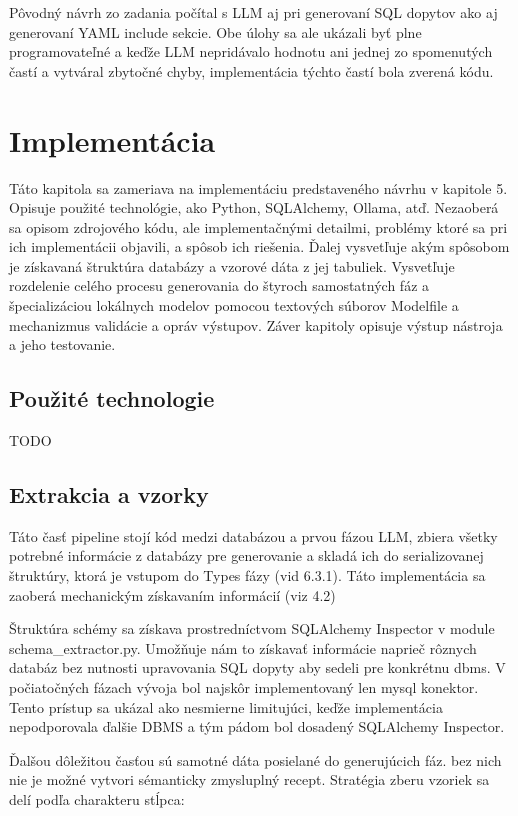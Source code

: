 Pôvodný návrh zo zadania počítal s LLM aj pri generovaní SQL dopytov ako aj generovaní YAML include sekcie. Obe úlohy sa ale ukázali byť plne programovateľné a keďže LLM nepridávalo hodnotu ani  jednej zo spomenutých častí a vytváral zbytočné chyby, implementácia týchto častí bola zverená kódu.

\chapter{Implementácia}
\label{ch:kap6}
Táto kapitola sa zameriava na implementáciu predstaveného návrhu v kapitole 5. Opisuje použité technológie, ako Python, SQLAlchemy, Ollama, atď. Nezaoberá sa  opisom zdrojového kódu, ale implementačnými detailmi, problémy ktoré sa pri ich implementácii objavili, a spôsob ich riešenia. Ďalej vysvetľuje akým spôsobom je získavaná štruktúra databázy a vzorové dáta z jej tabuliek. Vysvetľuje rozdelenie celého procesu generovania do štyroch samostatných fáz a špecializáciou lokálnych modelov pomocou textových súborov Modelfile a mechanizmus validácie a opráv výstupov. Záver kapitoly opisuje výstup nástroja a jeho testovanie.

\section{Použité technologie}
TODO

\section{Extrakcia a vzorky}
Táto časť pipeline stojí kód medzi databázou a prvou fázou LLM, zbiera všetky potrebné informácie z databázy pre generovanie a skladá ich do serializovanej štruktúry, ktorá je vstupom do Types fázy (vid 6.3.1). Táto implementácia  sa zaoberá mechanickým získavaním informácií (viz 4.2)

Štruktúra schémy sa získava prostredníctvom SQLAlchemy Inspector v module schema\_extractor.py. Umožňuje nám to získavať informácie naprieč rôznych databáz bez nutnosti upravovania SQL dopyty aby sedeli pre konkrétnu dbms. V počiatočných fázach vývoja bol najskôr implementovaný len mysql konektor. Tento prístup sa ukázal ako nesmierne limitujúci, keďže implementácia nepodporovala ďalšie DBMS a tým pádom bol dosadený SQLAlchemy Inspector.

Ďalšou dôležitou časťou sú samotné dáta posielané do generujúcich fáz. bez nich nie je možné vytvori sémanticky zmysluplný recept. Stratégia zberu vzoriek sa delí podľa charakteru stĺpca:

